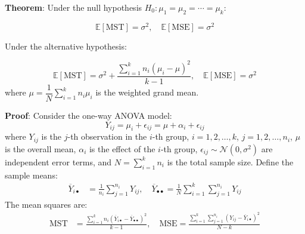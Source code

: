 \documentclass[twoside]{book}
\begin{document}
\begin{textbox}
\textbf{Theorem}: Under the null hypothesis $H_0: \mu_1 = \mu_2 = \cdots = \mu_k$:

\begin{equation*}
\mathbb{E}[\text{MST}] = \sigma^2, \quad \mathbb{E}[\text{MSE}] = \sigma^2
\end{equation*}

Under the alternative hypothesis:

\begin{equation*}
\mathbb{E}[\text{MST}] = \sigma^2 + \frac{\sum_{i=1}^k n_i(\mu_i - \mu)^2}{k-1}, \quad \mathbb{E}[\text{MSE}] = \sigma^2
\end{equation*}
where $\mu = \dfrac{1}{N}\sum_{i=1}^k n_i \mu_i$ is the weighted grand mean.
\end{textbox}
\textbf{Proof}: Consider the one-way ANOVA model:
\begin{equation*}
Y_{ij} = \mu_i + \epsilon_{ij} = \mu + \alpha_i + \epsilon_{ij}
\end{equation*}
where $Y_{ij}$ is the $j$-th observation in the $i$-th group, $i = 1, 2, \ldots, k$, $j = 1, 2, \ldots, n_i$, $\mu$ is the overall mean, $\alpha_i$ is the effect of the $i$-th group, $\epsilon_{ij} \sim \mathcal{N}(0, \sigma^2)$ are independent error terms, and $N = \sum_{i=1}^k n_i$ is the total sample size.
Define the sample means:
\begin{align*}
\overline{Y}_{i\bullet} &= \frac{1}{n_i}\sum_{j=1}^{n_i} Y_{ij}, \quad \overline{Y}_{\bullet\bullet} = \frac{1}{N}\sum_{i=1}^k \sum_{j=1}^{n_i} Y_{ij}
\end{align*}
The mean squares are:
\begin{align*}
\text{MST} &= \frac{\sum_{i=1}^k n_i(\overline{Y}_{i\bullet} - \overline{Y}_{\bullet\bullet})^2}{k-1}, \quad \text{MSE} = \frac{\sum_{i=1}^k \sum_{j=1}^{n_i}(Y_{ij} - \overline{Y}_{i\bullet})^2}{N-k}
\end{align*}
\end{document}
